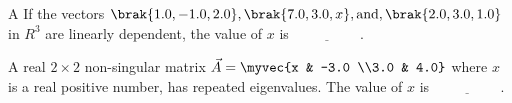 \item A If the vectors $\brak{1.0, -1.0, 2.0},  \brak{7.0,3.0, x},  \text{and},  \brak{2.0,3.0,1.0}$ in $R^3$ are linearly dependent, the value of $x$ is $\underline{\hspace{2cm}}$. 
\hfill {}
\item A real $ 2 \times 2 $ non-singular matrix  $\vec{A}= \myvec{x & -3.0 \\3.0 & 4.0}$ 
where $x$ is a real positive number, has repeated eigenvalues. The value of $x$  is $\underline{\hspace{2cm}}$.
\hfill {}
